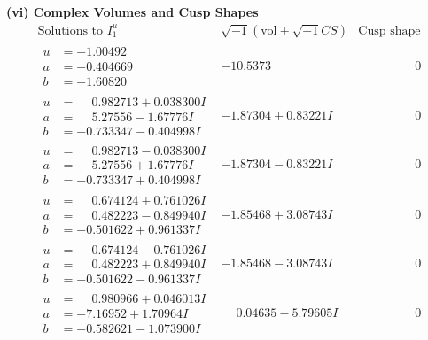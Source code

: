 \documentclass[1p]{elsarticle_modified}
\theoremstyle{definition}
\newcommand{\I}{\sqrt{-1}}
\begin{document}
\newpage\flushleft \textbf{(vi) Complex Volumes and Cusp Shapes}
$$\begin{array}{c|c|c}  
\text{Solutions to }I^u_{1}& \I (\text{vol} + \sqrt{-1}CS) & \text{Cusp shape}\\
 \hline 
\begin{aligned}
u &= -1.00492\phantom{ +0.000000I} \\
a &= -0.404669\phantom{ +0.000000I} \\
b &= -1.60820\phantom{ +0.000000I}\end{aligned}
 & -10.5373\phantom{ +0.000000I} & \phantom{-0.000000 } 0 \\ \hline\begin{aligned}
u &= \phantom{-}0.982713 + 0.038300 I \\
a &= \phantom{-}5.27556 - 1.67776 I \\
b &= -0.733347 - 0.404998 I\end{aligned}
 & -1.87304 + 0.83221 I & \phantom{-0.000000 } 0 \\ \hline\begin{aligned}
u &= \phantom{-}0.982713 - 0.038300 I \\
a &= \phantom{-}5.27556 + 1.67776 I \\
b &= -0.733347 + 0.404998 I\end{aligned}
 & -1.87304 - 0.83221 I & \phantom{-0.000000 } 0 \\ \hline\begin{aligned}
u &= \phantom{-}0.674124 + 0.761026 I \\
a &= \phantom{-}0.482223 - 0.849940 I \\
b &= -0.501622 + 0.961337 I\end{aligned}
 & -1.85468 + 3.08743 I & \phantom{-0.000000 } 0 \\ \hline\begin{aligned}
u &= \phantom{-}0.674124 - 0.761026 I \\
a &= \phantom{-}0.482223 + 0.849940 I \\
b &= -0.501622 - 0.961337 I\end{aligned}
 & -1.85468 - 3.08743 I & \phantom{-0.000000 } 0 \\ \hline\begin{aligned}
u &= \phantom{-}0.980966 + 0.046013 I \\
a &= -7.16952 + 1.70964 I \\
b &= -0.582621 - 1.073900 I\end{aligned}
 & \phantom{-}0.04635 - 5.79605 I & \phantom{-0.000000 } 0 \\ \hline\begin{aligned}

\end{aligned}
\end{array}$$
\end{document}
